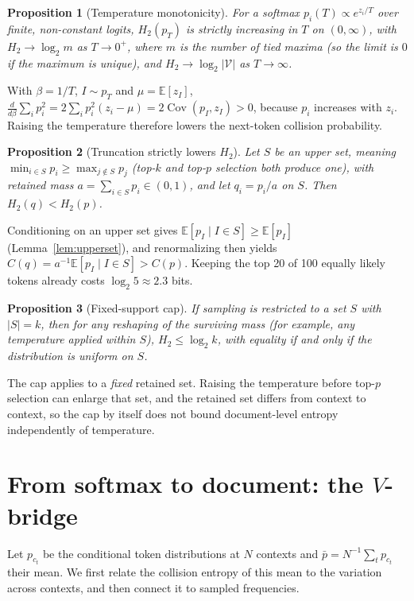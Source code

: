 \documentclass[10pt]{article}
\theoremstyle{plain}
\newtheorem{proposition}{Proposition}
\theoremstyle{definition}
\newcommand{\V}{\mathcal{V}}
\newcommand{\E}{\mathbb{E}}
\newcommand{\Cov}{\operatorname{Cov}}
\newcommand{\pbar}{\bar p}
\newcommand{\Htwo}{H_2}
\begin{document}
\begin{proposition}[Temperature monotonicity]
\label{thm:temp}
For a softmax $p_i(T)\propto e^{z_i/T}$ over finite, non-constant logits, $\Htwo(p_T)$ is strictly increasing in $T$ on $(0,\infty)$, with $\Htwo\to\log_2 m$ as $T\to 0^+$, where $m$ is the number of tied maxima (so the limit is $0$ if the maximum is unique), and $\Htwo\to\log_2|\V|$ as $T\to\infty$.
\end{proposition}
With $\beta=1/T$, $I\sim p_T$ and $\mu=\E[z_I]$,
$\frac{d}{d\beta}\sum_i p_i^2 = 2\sum_i p_i^2(z_i-\mu)=2\Cov(p_I,z_I)>0$, because $p_i$
increases with $z_i$. Raising the temperature therefore lowers the next-token collision
probability.

\begin{proposition}[Truncation strictly lowers $\Htwo$]
\label{thm:trunc}
Let $S$ be an upper set, meaning $\min_{i\in S}p_i\ge\max_{j\notin S}p_j$ (top-$k$ and top-$p$ selection both produce one), with retained mass $a=\sum_{i\in S}p_i\in(0,1)$, and let $q_i=p_i/a$ on $S$. Then $\Htwo(q)<\Htwo(p)$.
\end{proposition}
Conditioning on an upper set gives $\E[p_I\mid I\in S]\ge\E[p_I]$ (Lemma~\ref{lem:upperset}),
and renormalizing then yields $C(q)=a^{-1}\E[p_I\mid I\in S]>C(p)$. Keeping the top 20 of 100
equally likely tokens already costs $\log_2 5\approx2.3$ bits.

\begin{proposition}[Fixed-support cap]
\label{prop:cap}
If sampling is restricted to a set $S$ with $|S|=k$, then for any reshaping of the surviving mass (for example, any temperature applied within $S$), $\Htwo\le\log_2 k$, with equality if and only if the distribution is uniform on $S$.
\end{proposition}
The cap applies to a \emph{fixed} retained set. Raising the temperature before top-$p$
selection can enlarge that set, and the retained set differs from context to context, so the
cap by itself does not bound document-level entropy independently of temperature.

\section{From softmax to document: the \texorpdfstring{$V$}{V}-bridge}
\label{sec:vbridge}

Let $p_{c_t}$ be the conditional token distributions at $N$ contexts and
$\pbar=N^{-1}\sum_t p_{c_t}$ their mean. We first relate the collision entropy of this mean to
the variation across contexts, and then connect it to sampled frequencies.
\end{document}
